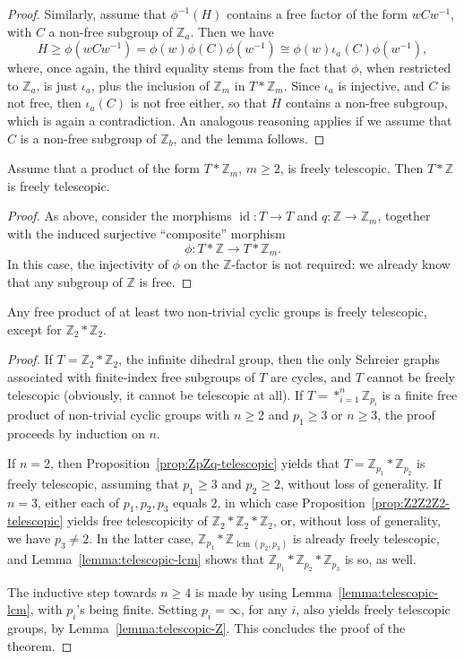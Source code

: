 \documentclass[ALCO,ThmDefs,Unicode,epreuves]{cedram}
\newcommand{\ZZ}{\mathbb{Z}}
\DeclareMathOperator{\lcm}{lcm}
\DeclareMathOperator{\id}{id}
\begin{document}
\begin{proof}
Similarly, assume that ${\phi}^{-1}(H)$ contains a free factor of the form $wCw^{-1}$, with $C$ a non-free subgroup of $\ZZ_a$.
Then we have
\[
H \geq \phi(wCw^{-1}) = \phi(w)\phi(C)\phi(w^{-1}) \cong \phi(w){\iota}_a(C)\phi(w^{-1}),
\]
where, once again, the third equality stems from the fact that ${\phi}$, when restricted to $\ZZ_a$, is just ${\iota}_a$, plus the inclusion of $\ZZ_m$ in $T*\ZZ_m$. Since ${\iota}_a$ is injective, and $C$ is not free, then ${\iota}_a(C)$ is not free either, so that $H$ contains a non-free subgroup, which is again a contradiction. An analogous reasoning applies if we assume that $C$ is a non-free subgroup of $\ZZ_b$, and the lemma follows.
\end{proof}

\begin{lemm}\label{lemma:telescopic-Z}
Assume that a product of the form $T*\ZZ_m$, $m\geq 2$, is freely telescopic. Then $T*\ZZ$ is freely telescopic.
\end{lemm}
\begin{proof}
As above, consider the morphisms $\id : T\to T$ and $q: \ZZ\to \ZZ_m$, together with the induced surjective ``composite'' morphism
\[
{\phi}: T*\ZZ \to T*\ZZ_m. 
\]
In this case, the injectivity of ${\phi}$ on the $\ZZ$-factor is not required: we already know that any subgroup of $\ZZ$ is free.
\end{proof}

\begin{theo}\label{thm:free-products-are-telescopic}
Any free product of at least two non-trivial cyclic groups is freely telescopic, except for $\ZZ_2*\ZZ_2$.
\end{theo}

\begin{proof}
If $T = \ZZ_2*\ZZ_2$, the infinite dihedral group, then the only Schreier graphs associated with finite-index free subgroups of $T$ are cycles, and $T$ cannot be freely telescopic (obviously, it cannot be telescopic at all). If $T = \ast^{n}_{i=1} \ZZ_{p_i}$ is a finite free product of non-trivial cyclic groups with $n \geq 2$ and $p_1 \geq 3$ or $n \geq 3$, the proof proceeds by induction on $n$. 

If $n=2$, then Proposition~\ref{prop:ZpZq-telescopic} yields that $T = \ZZ_{p_{1}}*\ZZ_{p_{2}}$ is freely telescopic, assuming that $p_{1} \geq 3$ and $p_{2} \geq 2$, without loss of generality. If $n=3$, either each of $p_{1},p_{2},p_{3}$ equals $2$, in which case Proposition~\ref{prop:Z2Z2Z2-telescopic} yields free telescopicity of $\ZZ_{2}*\ZZ_{2}*\ZZ_{2}$, or, without loss of generality, we have $p_{3}\neq2$. In the latter case, $\ZZ_{p_{1}}*\ZZ_{\lcm(p_{2},p_{3})}$ is already freely telescopic, and Lemma~\ref{lemma:telescopic-lcm} shows that $\ZZ_{p_{1}}*\ZZ_{p_{2}}*\ZZ_{p_{3}}$ is so, as well.
 
The inductive step towards $n \geq 4$ is made by using Lemma~\ref{lemma:telescopic-lcm}, with $p_i$'s being finite. Setting $p_i=\infty$, for any $i$, also yields freely telescopic groups, by Lemma~\ref{lemma:telescopic-Z}. This concludes the proof of the theorem.
\end{proof}
\end{document}
